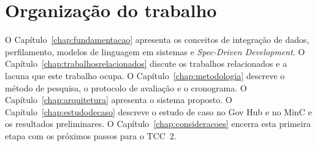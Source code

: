 \section{Organização do trabalho}
\label{sec:introducao-organizacao-do-trabalho}

O Capítulo~\ref{chap:fundamentacao} apresenta os conceitos de integração de
dados, perfilamento, modelos de linguagem em sistemas e
\emph{Spec-Driven Development}. O Capítulo~\ref{chap:trabalhosrelacionados}
discute os trabalhos relacionados e a lacuna que este trabalho ocupa. O
Capítulo~\ref{chap:metodologia} descreve o método de pesquisa, o protocolo de
avaliação e o cronograma. O Capítulo~\ref{chap:arquitetura} apresenta o
sistema proposto. O Capítulo~\ref{chap:estudodecaso} descreve o estudo de caso
no Gov Hub e no MinC e os resultados preliminares. O
Capítulo~\ref{chap:consideracoes} encerra esta primeira etapa com os próximos
passos para o TCC~2.
